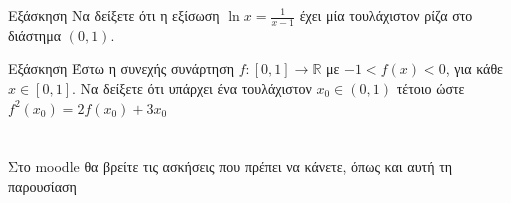 \documentclass[greek]{beamer}
\begin{document}
\begin{frame}{Εξάσκηση}
 Να δείξετε ότι η εξίσωση $\ln x=\frac{1}{x-1}$ έχει μία τουλάχιστον ρίζα στο διάστημα $(0,1)$.
\end{frame}

\begin{frame}{Εξάσκηση}
  Έστω η συνεχής συνάρτηση $f:[0,1]\to\mathbb{R}$ με $-1<f(x)<0$, για κάθε $x\in [0,1]$. Να δείξετε ότι υπάρχει ένα τουλάχιστον $x_0\in (0,1)$ τέτοιο ώστε $f^2(x_0)=2f(x_0)+3x_0$
\end{frame}

\section{}
\begin{frame}
 Στο moodle θα βρείτε τις ασκήσεις που πρέπει να κάνετε, όπως και αυτή τη παρουσίαση
\end{frame}
\end{document}

